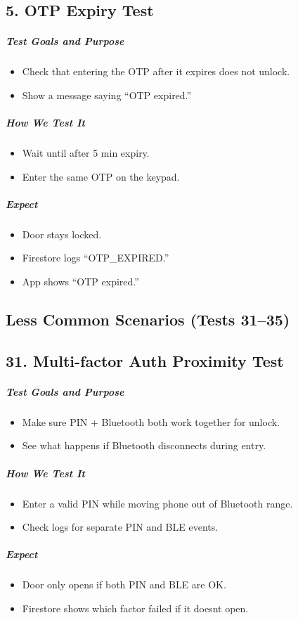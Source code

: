 \subsection*{5. OTP Expiry Test}
\subparagraph{Test Goals and Purpose}
\begin{itemize}
    \item Check that entering the OTP after it expires does not unlock.
    \item Show a message saying “OTP expired.”
\end{itemize}
\subparagraph{How We Test It}
\begin{itemize}
    \item Wait until after 5 min expiry.
    \item Enter the same OTP on the keypad.
\end{itemize}
\subparagraph{ Expect}
\begin{itemize}
    \item Door stays locked.
    \item Firestore logs “OTP\_EXPIRED.”
    \item App shows “OTP expired.”
\end{itemize}

\newpage
\subsection*{Less Common Scenarios (Tests 31–35)}

\subsection*{31. Multi-factor Auth Proximity Test}
\subparagraph{Test Goals and Purpose}
\begin{itemize}
    \item Make sure PIN + Bluetooth both work together for unlock.
    \item See what happens if Bluetooth disconnects during entry.
\end{itemize}
\subparagraph{How We Test It}
\begin{itemize}
    \item Enter a valid PIN while moving phone out of Bluetooth range.
    \item Check logs for separate PIN and BLE events.
\end{itemize}
\subparagraph{ Expect}
\begin{itemize}
    \item Door only opens if both PIN and BLE are OK.
    \item Firestore shows which factor failed if it doesnt open.
\end{itemize}

